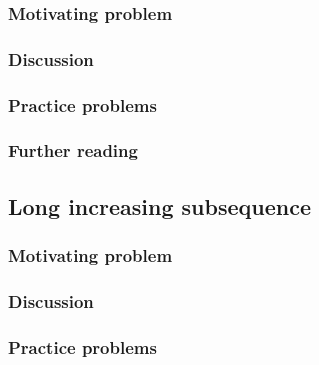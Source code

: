 \subsubsection*{Motivating problem}







\subsubsection*{Discussion}

\subsubsection*{Practice problems}

\subsubsection*{Further reading}

\subsection{Long increasing subsequence}

\subsubsection*{Motivating problem}







\subsubsection*{Discussion}

\subsubsection*{Practice problems}

